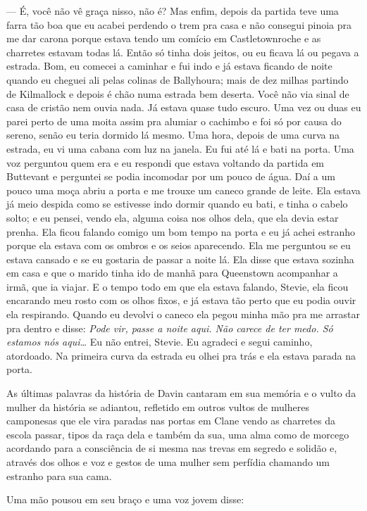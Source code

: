  --- É, você não vê graça nisso, não é? Mas enfim, depois da partida teve
uma farra tão boa que eu acabei perdendo o trem pra casa e não consegui
pinoia pra me dar carona porque estava tendo um comício em
Castletownroche e as charretes estavam todas lá. Então só tinha dois
jeitos, ou eu ficava lá ou pegava a estrada. Bom, eu comecei a caminhar
e fui indo e já estava ficando de noite quando eu cheguei ali pelas
colinas de Ballyhoura; mais de dez milhas partindo de Kilmallock e
depois é chão numa estrada bem deserta. Você não via sinal de casa de
cristão nem ouvia nada. Já estava quase tudo escuro. Uma vez ou duas eu
parei perto de uma moita assim pra alumiar o cachimbo e foi só por
causa do sereno, senão eu teria dormido lá mesmo. Uma hora, depois de
uma curva na estrada, eu vi uma cabana com luz na janela. Eu fui até lá
e bati na porta. Uma voz perguntou quem era e eu respondi que estava
voltando da partida em Buttevant e perguntei se podia incomodar por um
pouco de água. Daí a um pouco uma moça abriu a porta e me trouxe um
caneco grande de leite. Ela estava já meio despida como se estivesse
indo dormir quando eu bati, e tinha o cabelo solto; e eu pensei, vendo
ela, alguma coisa nos olhos dela, que ela devia estar prenha. Ela ficou
falando comigo um bom tempo na porta e eu já achei estranho porque ela
estava com os ombros e os seios aparecendo. Ela me perguntou se eu
estava cansado e se eu gostaria de passar a noite lá. Ela disse que
estava sozinha em casa e que o marido tinha ido de manhã para
Queenstown acompanhar a irmã, que ia viajar. E o tempo todo em que ela
estava falando, Stevie, ela ficou encarando meu rosto com os olhos
fixos, e já estava tão perto que eu podia ouvir ela respirando. Quando
eu devolvi o caneco ela pegou minha mão pra me arrastar pra dentro e
disse: \textit{Pode vir, passe a noite aqui. Não carece de ter medo. Só
estamos nós aqui\ldots{}} Eu não entrei, Stevie. Eu agradeci e segui
caminho, atordoado. Na primeira curva da estrada eu olhei pra trás e
ela estava parada na porta.

As últimas palavras da história de Davin cantaram em sua memória e o
vulto da mulher da história se adiantou, refletido em outros vultos de
mulheres camponesas que ele vira paradas nas portas em Clane vendo as
charretes da escola passar, tipos da raça dela e também da sua, uma
alma como de morcego acordando para a consciência de si mesma nas
trevas em segredo e solidão e, através dos olhos e voz e gestos de uma
mulher sem perfídia chamando um estranho para sua cama.

Uma mão pousou em seu braço e uma voz jovem disse:

